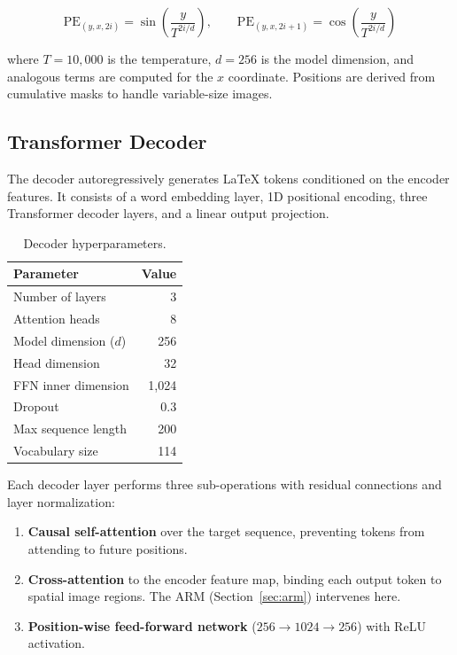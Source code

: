 \documentclass[11pt,a4paper]{article}
\begin{document}
\begin{equation}
\text{PE}_{(y,x,2i)} = \sin\!\left(\frac{y}{T^{2i/d}}\right), \qquad
\text{PE}_{(y,x,2i+1)} = \cos\!\left(\frac{y}{T^{2i/d}}\right)
\label{eq:posenc2d}
\end{equation}

where $T = 10{,}000$ is the temperature, $d = 256$ is the model dimension, and analogous terms are computed for the $x$ coordinate. Positions are derived from cumulative masks to handle variable-size images.

\subsection{Transformer Decoder}
\label{sec:decoder}

The decoder autoregressively generates \LaTeX{} tokens conditioned on the encoder features. It consists of a word embedding layer, 1D positional encoding, three Transformer decoder layers, and a linear output projection.

\begin{table}[H]
\centering
\caption{Decoder hyperparameters.}
\label{tab:decoder}
\begin{tabular}{lr}
\toprule
\textbf{Parameter} & \textbf{Value} \\
\midrule
Number of layers         & 3 \\
Attention heads          & 8 \\
Model dimension ($d$)    & 256 \\
Head dimension           & 32 \\
FFN inner dimension      & 1{,}024 \\
Dropout                  & 0.3 \\
Max sequence length      & 200 \\
Vocabulary size          & 114 \\
\bottomrule
\end{tabular}
\end{table}

Each decoder layer performs three sub-operations with residual connections and layer normalization:

\begin{enumerate}[nosep]
  \item \textbf{Causal self-attention} over the target sequence, preventing tokens from attending to future positions.
  \item \textbf{Cross-attention} to the encoder feature map, binding each output token to spatial image regions. The ARM (Section~\ref{sec:arm}) intervenes here.
  \item \textbf{Position-wise feed-forward network} ($256 \to 1024 \to 256$) with ReLU activation.
\end{enumerate}
\end{document}

